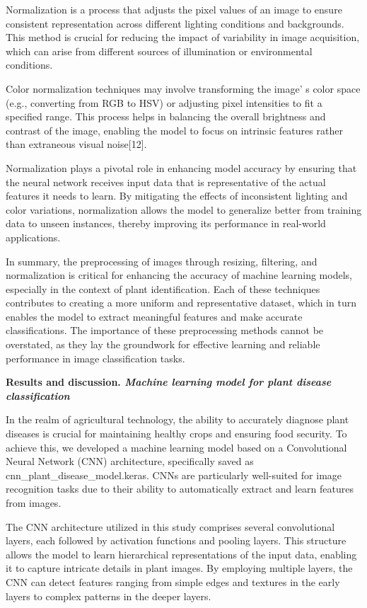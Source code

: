 {{Normalization is a process that adjusts the pixel values of an image to
ensure consistent representation across different lighting conditions
and backgrounds. This method is crucial for reducing the impact of
variability in image acquisition, which can arise from different sources
of illumination or environmental conditions.

Color normalization techniques may involve transforming the
image' s color space (e.g., converting from RGB to HSV)
or adjusting pixel intensities to fit a specified range. This process
helps in balancing the overall brightness and contrast of the image,
enabling the model to focus on intrinsic features rather than extraneous
visual noise{[}12{]}.

Normalization plays a pivotal role in enhancing model accuracy by
ensuring that the neural network receives input data that is
representative of the actual features it needs to learn. By mitigating
the effects of inconsistent lighting and color variations, normalization
allows the model to generalize better from training data to unseen
instances, thereby improving its performance in real-world applications.

In summary, the preprocessing of images through resizing, filtering, and
normalization is critical for enhancing the accuracy of machine learning
models, especially in the context of plant identification. Each of these
techniques contributes to creating a more uniform and representative
dataset, which in turn enables the model to extract meaningful features
and make accurate classifications. The importance of these preprocessing
methods cannot be overstated, as they lay the groundwork for effective
learning and reliable performance in image classification tasks.

{\bfseries Results and discussion. \emph{Machine learning model for plant
disease classification}}

In the realm of agricultural technology, the ability to accurately
diagnose plant diseases is crucial for maintaining healthy crops and
ensuring food security. To achieve this, we developed a machine learning
model based on a Convolutional Neural Network (CNN) architecture,
specifically saved as cnn\_plant\_disease\_model.keras. CNNs are
particularly well-suited for image recognition tasks due to their
ability to automatically extract and learn features from images.

The CNN architecture utilized in this study comprises several
convolutional layers, each followed by activation functions and pooling
layers. This structure allows the model to learn hierarchical
representations of the input data, enabling it to capture intricate
details in plant images. By employing multiple layers, the CNN can
detect features ranging from simple edges and textures in the early
layers to complex patterns in the deeper layers.

}}
